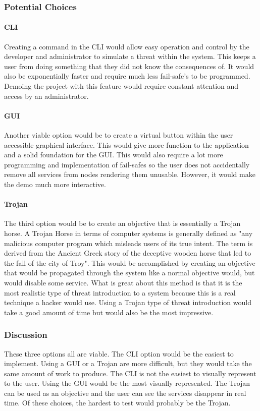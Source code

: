 \documentclass[draftclsnofoot, onecolumn, compsoc, 10pt]{IEEEtran}
\begin{document}
\subsubsection{Potential Choices}
\paragraph{CLI}
Creating a command in the CLI would allow easy operation and control by the developer and administrator to simulate a threat within the system. This keeps a user from doing something that they did not know the consequences of. It would also be exponentially faster and require much less fail-safe’s to be programmed. Demoing the project with this feature would require constant attention and access by an administrator.
\paragraph{GUI}
Another viable option would be to create a virtual button within the user accessible graphical interface. This would give more function to the application and a solid foundation for the GUI. This would also require a lot more programming and implementation of fail-safes so the user does not accidentally remove all services from nodes rendering them unusable. However, it would make the demo much more interactive.
\paragraph{Trojan}
The third option would be to create an objective that is essentially a Trojan horse. A Trojan Horse in terms of computer systems is generally defined as "any malicious computer program which misleads users of its true intent. The term is derived from the Ancient Greek story of the deceptive wooden horse that led to the fall of the city of Troy"\cite{Trojan}. This would be accomplished by creating an objective that would be propagated through the system like a normal objective would, but would disable some service. What is great about this method is that it is the most realistic type of threat introduction to a system because this is a real technique a hacker would use. Using a Trojan type of threat introduction would take a good amount of time but would also be the most impressive.
\subsubsection{Discussion}
These three options all are viable. The CLI option would be the easiest to implement. Using a GUI or a Trojan are more difficult, but they would take the same amount of work to produce. The CLI is not the easiest to visually represent to the user. Using the GUI would be the most visually represented. The Trojan can be used as an objective and the user can see the services disappear in real time. Of these choices, the hardest to test would probably be the Trojan.
\end{document}
